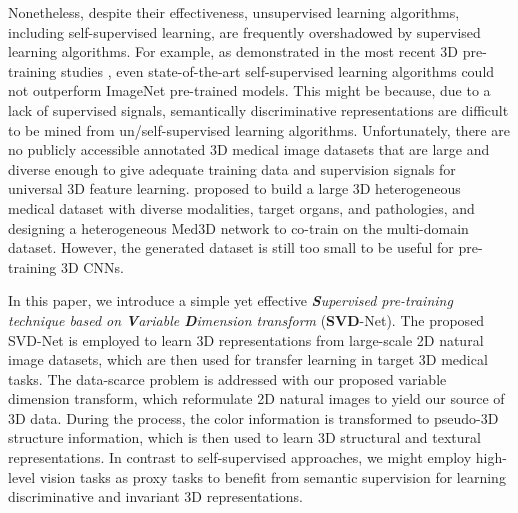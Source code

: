 \documentclass[journal,twoside,web]{ieeecolor}
\begin{document}
Nonetheless, despite their effectiveness, unsupervised learning algorithms, including self-supervised learning, are frequently overshadowed by supervised learning algorithms. For example, as demonstrated in the most recent 3D pre-training studies \cite{zhou2020models,zhou2020comparing}, even state-of-the-art self-supervised learning algorithms could not outperform ImageNet pre-trained models. This might be because, due to a lack of supervised signals, semantically discriminative representations are difficult to be mined from un/self-supervised learning algorithms. Unfortunately, there are no publicly accessible annotated 3D medical image datasets that are large  and diverse enough to give adequate training data and supervision signals for universal 3D feature learning. \cite{chen2019med3d} proposed to build a large 3D heterogeneous medical dataset with diverse modalities, target organs, and pathologies, and designing a heterogeneous Med3D network to co-train on the multi-domain dataset. However, the generated dataset is still too small to be useful for pre-training 3D CNNs.


In this paper, we introduce a simple yet effective \textit{\textbf{S}upervised pre-training technique based on \textbf{V}ariable \textbf{D}imension transform} (\textbf{SVD}-Net). The proposed SVD-Net is employed to learn 3D representations from large-scale 2D natural image datasets, which are then used for transfer learning in target 3D medical tasks. The data-scarce problem is addressed with our proposed variable dimension transform, which reformulate 2D natural images to yield our source of 3D data. During the process, the color information is transformed to pseudo-3D structure information, which is then used to learn 3D structural and textural representations. In contrast to self-supervised approaches, we might employ high-level vision tasks as proxy tasks to benefit from semantic supervision for learning discriminative and invariant 3D representations.
\end{document}
